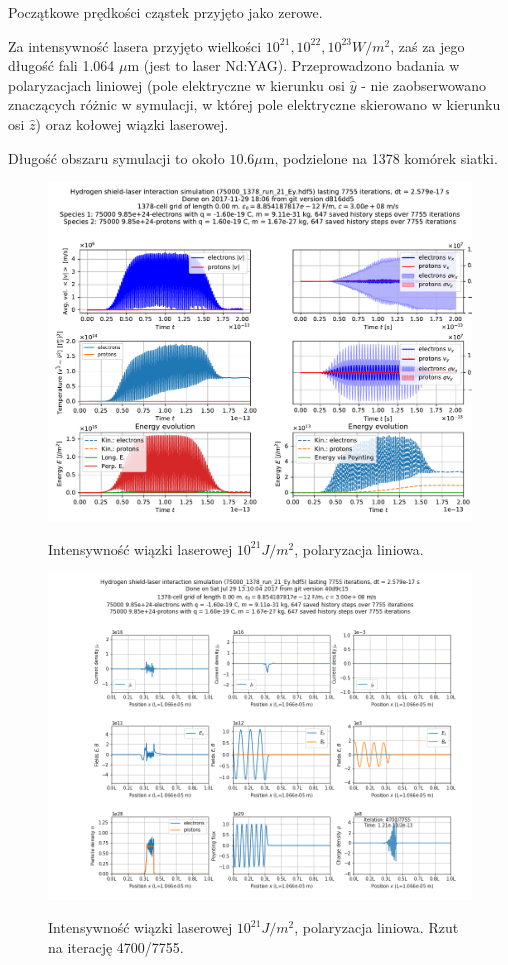 Początkowe prędkości cząstek przyjęto jako zerowe.

Za intensywność lasera przyjęto wielkości $10^{21}, 10^{22}, 10^{23} W/m^2$,
zaś za jego długość fali 1.064 $\mu$m (jest to laser Nd:YAG). Przeprowadzono
badania w polaryzacjach liniowej (pole elektryczne w kierunku osi $\hat{y}$ -
nie zaobserwowano znaczących różnic w symulacji, w której pole elektryczne
skierowano w kierunku osi $\hat{z}$) %
oraz kołowej wiązki laserowej.

Długość obszaru symulacji to około $10.6 \mu$m, podzielone na 1378 komórek siatki.

\begin{figure}[h!]
  \includegraphics[width=\textwidth]{Images/75000_1378_run_21_Ey}
  \label{fig:laser-21-Ey}
  \caption{Intensywność wiązki laserowej $10^{21} J/m^2$, polaryzacja liniowa.}
\end{figure}

\begin{figure}[h!]
  \includegraphics[width=\textwidth]{Images/75000_1378_run_21_Ey_004700}
  \label{fig:laser-21-Ey-snapshot}
  \caption{Intensywność wiązki laserowej $10^{21} J/m^2$, polaryzacja liniowa. Rzut na iterację 4700/7755.}
\end{figure}

